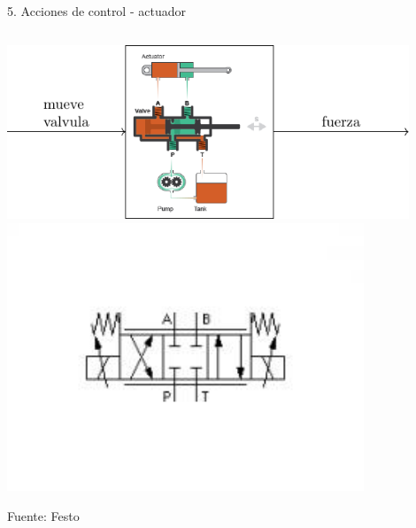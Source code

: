 \documentclass[presentation,aspectratio=169]{beamer}
\begin{document}
\begin{frame}[label={sec:orgcf65506}]{5. Acciones de control - actuador}
\begin{columns}
\begin{column}{0.5\columnwidth}
\begin{center}
\includegraphics[width=0.9\textwidth]{../../figures/ac75-control-actuator-only}\\
\includegraphics[width=0.8\textwidth]{../../figures/43-valve-proportional.jpg}
\end{center}

{\footnotesize Fuente: Festo}
\end{column}


\end{columns}
\end{frame}
\end{document}
